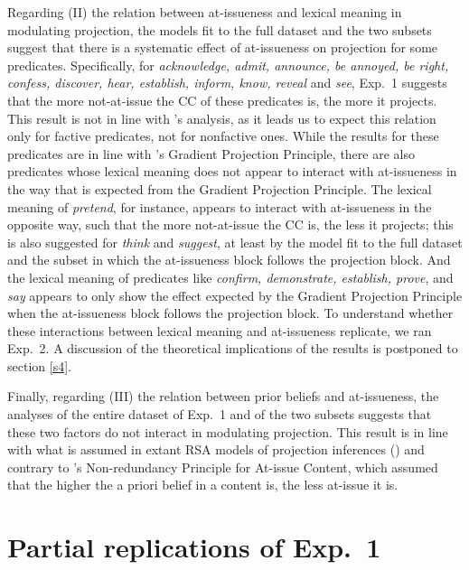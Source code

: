 \documentclass[11pt,fleqn]{article}
\newcommand{\6}{\mbox{$[\hspace*{-.6mm}[$}}
\newcommand{\9}{\mbox{$]\hspace*{-.6mm}]$}}
\newcommand{\citepos}[1]{\citeauthor{#1}'s \citeyear{#1}}
\begin{document}
Regarding (II) the relation between at-issueness and lexical meaning in modulating projection, the models fit to the full dataset and the two subsets suggest that there is a systematic effect of at-issueness on projection for some predicates. Specifically, for {\em acknowledge, admit, announce,  be annoyed, be right, confess, discover, hear, establish, inform, know, reveal} and {\em see}, Exp.~1 suggests that the more not-at-issue the CC of these predicates is, the more it projects. This result is not in line with \citepos{djaerv-bacovcin2020} analysis, as it leads us to expect this relation only for factive predicates, not for nonfactive ones. While the results for these predicates are in line with \citepos{tbd-variability} Gradient Projection Principle, there are also predicates whose lexical meaning does not appear to interact with at-issueness in the way that is expected from the Gradient Projection Principle. The lexical meaning of {\em pretend}, for instance, appears to interact with at-issueness in the opposite way, such that the more not-at-issue the CC is, the less it projects; this is also suggested for {\em think} and {\em suggest}, at least by the model fit to the full dataset and the subset in which the at-issueness block follows the projection block. And the lexical meaning of predicates like {\em confirm, demonstrate, establish, prove}, and {\em say} appears to only show the effect expected by the Gradient Projection Principle when the at-issueness block follows the projection block. To understand whether these interactions between lexical meaning and at-issueness replicate, we ran Exp.~2. A discussion of the theoretical implications of the results is postponed to section \ref{s4}.

Finally, regarding (III) the relation between prior beliefs and at-issueness, the analyses of the entire dataset of Exp.~1 and of the two subsets suggests that these two factors do not interact in modulating projection. This result is in line with what is assumed in extant RSA models of projection inferences (\citealt{qing-etal2016,stevens-etal2017,warstadt2022,pan-degen2023}) and contrary to \citepos{tonhauser-etal-eval} Non-redundancy Principle for At-issue Content, which assumed that the higher the a priori belief in a content is, the less at-issue it is. 

\section{Partial replications of Exp.~1}\label{s3}
\end{document}
